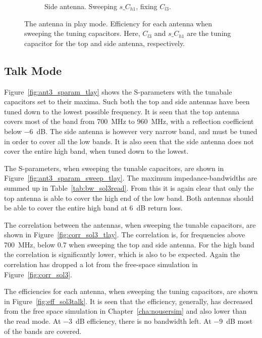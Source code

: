 \begin{figure}[htbp]
\begin{subfigure}{0.49\linewidth}
        \caption{Side antenna. Sweeping $s\_C_{h1}$, fixing $C_{l3}$.}
    \end{subfigure}
    \caption{The antenna in play mode. Efficiency for each antenna when sweeping the tuning capacitors. Here, $C_{l3}$ and $s\_C_{h1}$ are the tuning capacitor for the top and side antenna, respectively.}
    \label{fig:eff_sol3play}
\end{figure}

\FloatBarrier
\subsection{Talk Mode}
Figure~\ref{fig:ant3_sparam_tlay} shows the S-parameters with the tunabale capacitors set to their maxima. Such both the top and side antennas have been tuned down to the lowest possible frequency. It is seen that the top antenna covers most of the band from \SI{700}{MHz} to \SI{960}{MHz}, with a reflection coefficient below \SI{-6}{dB}. The side antenna is however very narrow band, and must be tuned in order to cover all the low bands. It is also seen that the side antenna does not cover the entire high band, when tuned down to the lowest. 

The S-parameters, when sweeping the tunable capacitors, are shown in Figure~\ref{fig:ant3_sparam_sweep_tlay}. The maximum impedance-bandwidths are summed up in Table~\ref{tab:bw_sol3read}. From this it is again clear that only the top antenna is able to cover the high end of the low band. Both antennas should be able to cover the entire high band at \SI{6}{dB} return loss.

The correlation between the antennas, when sweeping the tunable capacitors, are shown in Figure~\ref{fig:corr_sol3_tlay}. The correlation is, for frequencies above \SI{700}{MHz}, below 0.7 when sweeping the top and side antenna. For the high band the correlation is significantly lower, which is also to be expected. Again the correlation has dropped a lot from the free-space simulation in Figure~\ref{fig:corr_sol3}.

The efficiencies for each antenna, when sweeping the tuning capacitors, are shown in Figure~\ref{fig:eff_sol3talk}. It is seen that the efficiency, generally, has decreased from the free space simulation in Chapter~\ref{cha:nousersim} and also lower than the read mode. At \SI{-3}{dB} efficiency, there is no bandwidth left. At \SI{-9}{dB} most of the bands are covered.


